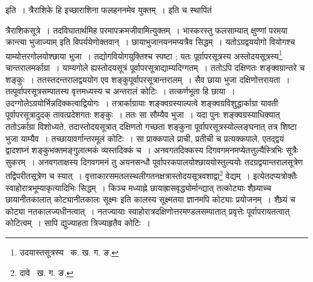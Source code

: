 \documentclass[11pt, openany]{book}
\begin{document}
\noindent इति~। त्रैराशिके हि इच्छाराशिना फलहननमेव युक्तम्~। इति च स्थापितं 

\newpage

\noindent त्रैराशिकसूत्रे~। तदविघातार्थमिह परमापक्रमजीवामित्युक्तम्~। भास्करस्तु फलसाम्यात् {\qt क्षुण्णां परमया क्रान्त्या भुजाज्याम्} इति विपर्ययेणोक्तवान्~। छायाभुजानयनमप्यत्रैव सिद्धम्~। यतोऽग्रद्वययोगो वियोगश्च याम्योत्तरगोलयोश्छाया भुजा~। तद्योगवियोगयुक्तिश्च स्पष्टा ; यतः पूर्वापरसूत्रस्य अस्तोदयसूत्रस्य\renewcommand{\thefootnote}{१}\footnote{उदयास्तसूत्रस्य \textendash\ क. ख. ग. ङ.} चान्तरालमर्काग्रा~। याम्यगोले ह्यस्तोदयसूत्रं पूर्वापरसूत्राद्याम्यदिग्गतम्~। ततोऽपि दक्षिणतः शङ्क्वग्रान्तरे च शङ्कुः~। ततस्तदन्तरालद्वययोग एव शङ्कुपूर्वापरसूत्रान्तरालम्~। सैव छाया भुजा दक्षिणोत्तरायता~। तत्पूर्वापरसूत्रसम्पातस्य वृत्तमध्यस्य च अन्तरालं कोटिः~। तत्कर्णभूता हि छाया~। उदग्गोलेऽग्रयोर्भिन्नदिक्कत्वाद्वियोगः~। तत्रार्काग्रायाः शङ्क्वग्रस्याल्पत्वे शङ्क्वग्रविशुद्धार्काग्रा यावती पूर्वापरसूत्रादुदक् तावत्प्रदेशगतः शङ्कुः~। ततः सा सौम्यैव भुजा~। यदा पुनः शङ्क्वग्रस्याधिक्यात् ततोऽर्काग्रा विशोध्यते, तदास्तोदयसूत्रात् दक्षिणतो गच्छता शङ्कुना पूर्वापरसूत्रस्योल्लङ्घनात् तत्र शिष्टा भुजा याम्यैव~। तच्छायावर्गान्तरमूलं कोटिः~। सा प्राक्कपाले प्राची, प्रतीची च प्रत्यक्कपाले, एतद्द्वयं द्वादशघ्नं शङ्कुभक्तमङ्गुलात्मकं व्यस्तदिक्कं च~। अनवगतदिक्कस्य दिगवगमनमप्येतत्तुल्यैस्त्रिभिः सूत्रैः सुकरम्~। अनवगताक्षस्य दिगवगमनं तु अयनसन्धौ पूर्वापरकपालयोश्छाययोस्तुल्ययोः तदग्रद्वयान्तरालसूत्रेण तद्विपरीतसूत्रेण च स्यात्~। वृत्ताकारसमतलस्थलीगतनक्षत्रास्तोदयसूत्रवशाद्वा\renewcommand{\thefootnote}{२}\footnote{दावे \textendash\ ख. ग. ङ.} वेद्यम्~। इत्येतदप्यत्रोक्तैः स्वाहोरात्रभूम्याकृत्यादिभिः सिद्धम्~। किञ्च मध्याह्ने छायाह्रासवृद्ध्योर्मान्द्यात्
तत्कोट्याः शैघ्र्याच्च छायानीतकालात् कोट्यानीतकालः सूक्ष्मः इति कालस्य सूक्ष्मतया ज्ञानमपि कोट्याः प्रयोजनम्~। शैघ्र्यं च कोट्या नतकालज्यधीनत्वात्~। नतज्यायाः स्वाहोरात्रदक्षिणोत्तरमण्डलसम्पातात् प्रवृत्तेः पूर्वापरायतत्वात् कोटित्वम्~। सापि द्युज्याहता त्रिज्याहृतैव कोटिः~। 

\newpage
\end{document}
